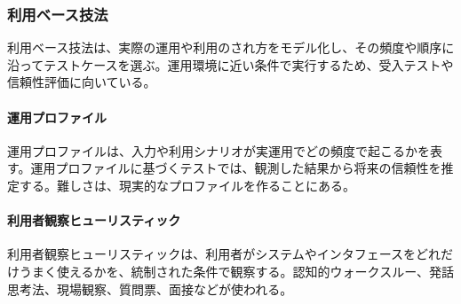 \subsubsection{利用ベース技法}
利用ベース技法は、実際の運用や利用のされ方をモデル化し、その頻度や順序に沿ってテストケースを選ぶ。運用環境に近い条件で実行するため、受入テストや信頼性評価に向いている。

\paragraph{運用プロファイル}
運用プロファイルは、入力や利用シナリオが実運用でどの頻度で起こるかを表す。運用プロファイルに基づくテストでは、観測した結果から将来の信頼性を推定する。難しさは、現実的なプロファイルを作ることにある。

\paragraph{利用者観察ヒューリスティック}
利用者観察ヒューリスティックは、利用者がシステムやインタフェースをどれだけうまく使えるかを、統制された条件で観察する。認知的ウォークスルー、発話思考法、現場観察、質問票、面接などが使われる。
